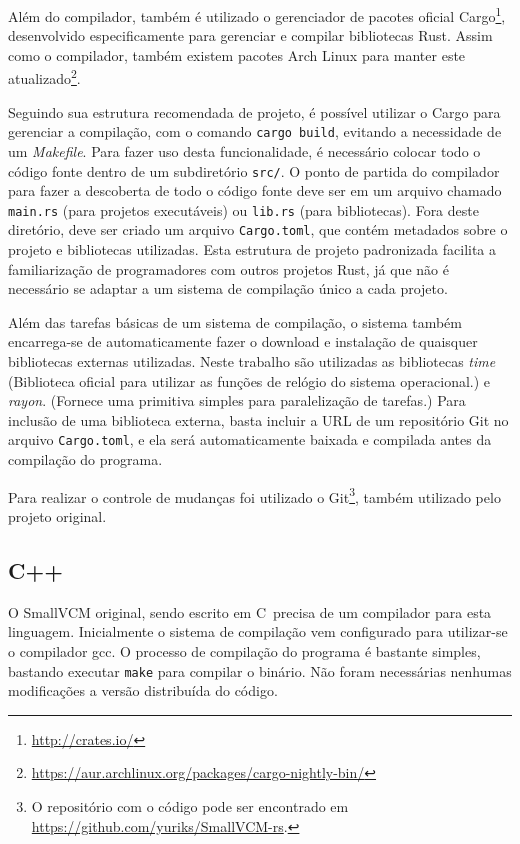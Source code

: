 \documentclass[tg]{mdtufsm}
\def\Cpp{{C\nolinebreak[4]\raisebox{.20ex}{\small\bf++}}}
\begin{document}
Além do compilador, também é utilizado o gerenciador de pacotes oficial Cargo\footnote{\url{http://crates.io/}}, desenvolvido especificamente para gerenciar e compilar bibliotecas Rust. Assim como o compilador, também existem pacotes Arch Linux para manter este atualizado\footnote{\url{https://aur.archlinux.org/packages/cargo-nightly-bin/}}.

Seguindo sua estrutura recomendada de projeto, é possível utilizar o Cargo para gerenciar a compilação, com o comando \texttt{cargo build}, evitando a necessidade de um \emph{Makefile}. Para fazer uso desta funcionalidade, é necessário colocar todo o código fonte dentro de um subdiretório \texttt{src/}. O ponto de partida do compilador para fazer a descoberta de todo o código fonte deve ser em um arquivo chamado \texttt{main.rs} (para projetos executáveis) ou \texttt{lib.rs} (para bibliotecas). Fora deste diretório, deve ser criado um arquivo \texttt{Cargo.toml}, que contém metadados sobre o projeto e bibliotecas utilizadas. Esta estrutura de projeto padronizada facilita a familiarização de programadores com outros projetos Rust, já que não é necessário se adaptar a um sistema de compilação único a cada projeto.

Além das tarefas básicas de um sistema de compilação, o sistema também encarrega-se de automaticamente fazer o download e instalação de quaisquer bibliotecas externas utilizadas. Neste trabalho são utilizadas as bibliotecas \emph{time} (Biblioteca oficial para utilizar as funções de relógio do sistema operacional.) e \emph{rayon}. (Fornece uma primitiva simples para paralelização de tarefas.) Para inclusão de uma biblioteca externa, basta incluir a URL de um repositório Git no arquivo \texttt{Cargo.toml}, e ela será automaticamente baixada e compilada antes da compilação do programa.

Para realizar o controle de mudanças foi utilizado o Git\footnote{O repositório com o código pode ser encontrado em \url{https://github.com/yuriks/SmallVCM-rs}.}, também utilizado pelo projeto original.

\subsection{C++}

O SmallVCM original, sendo escrito em \Cpp\ precisa de um compilador para esta linguagem. Inicialmente o sistema de compilação vem configurado para utilizar-se o compilador gcc. O processo de compilação do programa é bastante simples, bastando executar \texttt{make} para compilar o binário. Não foram necessárias nenhumas modificações a versão distribuída do código.
\end{document}
